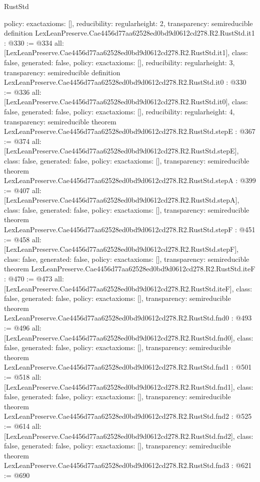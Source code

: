 \begin{lexlean}{RustStd}
\begin{coremodule}
{  policy: exact{axioms: []},
  reducibility: regular{height: 2},
  transparency: semireducible
}
definition LexLeanPreserve.Cae4456d77aa62528ed0bd9d0612cd278.R2.RustStd.it1 : @330 := @334 {
  all: [LexLeanPreserve.Cae4456d77aa62528ed0bd9d0612cd278.R2.RustStd.it1],
  class: false,
  generated: false,
  policy: exact{axioms: []},
  reducibility: regular{height: 3},
  transparency: semireducible
}
definition LexLeanPreserve.Cae4456d77aa62528ed0bd9d0612cd278.R2.RustStd.it0 : @330 := @336 {
  all: [LexLeanPreserve.Cae4456d77aa62528ed0bd9d0612cd278.R2.RustStd.it0],
  class: false,
  generated: false,
  policy: exact{axioms: []},
  reducibility: regular{height: 4},
  transparency: semireducible
}
theorem LexLeanPreserve.Cae4456d77aa62528ed0bd9d0612cd278.R2.RustStd.stepE : @367 := @374 {
  all: [LexLeanPreserve.Cae4456d77aa62528ed0bd9d0612cd278.R2.RustStd.stepE],
  class: false,
  generated: false,
  policy: exact{axioms: []},
  transparency: semireducible
}
theorem LexLeanPreserve.Cae4456d77aa62528ed0bd9d0612cd278.R2.RustStd.stepA : @399 := @407 {
  all: [LexLeanPreserve.Cae4456d77aa62528ed0bd9d0612cd278.R2.RustStd.stepA],
  class: false,
  generated: false,
  policy: exact{axioms: []},
  transparency: semireducible
}
theorem LexLeanPreserve.Cae4456d77aa62528ed0bd9d0612cd278.R2.RustStd.stepF : @451 := @458 {
  all: [LexLeanPreserve.Cae4456d77aa62528ed0bd9d0612cd278.R2.RustStd.stepF],
  class: false,
  generated: false,
  policy: exact{axioms: []},
  transparency: semireducible
}
theorem LexLeanPreserve.Cae4456d77aa62528ed0bd9d0612cd278.R2.RustStd.iteF : @470 := @473 {
  all: [LexLeanPreserve.Cae4456d77aa62528ed0bd9d0612cd278.R2.RustStd.iteF],
  class: false,
  generated: false,
  policy: exact{axioms: []},
  transparency: semireducible
}
theorem LexLeanPreserve.Cae4456d77aa62528ed0bd9d0612cd278.R2.RustStd.fnd0 : @493 := @496 {
  all: [LexLeanPreserve.Cae4456d77aa62528ed0bd9d0612cd278.R2.RustStd.fnd0],
  class: false,
  generated: false,
  policy: exact{axioms: []},
  transparency: semireducible
}
theorem LexLeanPreserve.Cae4456d77aa62528ed0bd9d0612cd278.R2.RustStd.fnd1 : @501 := @518 {
  all: [LexLeanPreserve.Cae4456d77aa62528ed0bd9d0612cd278.R2.RustStd.fnd1],
  class: false,
  generated: false,
  policy: exact{axioms: []},
  transparency: semireducible
}
theorem LexLeanPreserve.Cae4456d77aa62528ed0bd9d0612cd278.R2.RustStd.fnd2 : @525 := @614 {
  all: [LexLeanPreserve.Cae4456d77aa62528ed0bd9d0612cd278.R2.RustStd.fnd2],
  class: false,
  generated: false,
  policy: exact{axioms: []},
  transparency: semireducible
}
theorem LexLeanPreserve.Cae4456d77aa62528ed0bd9d0612cd278.R2.RustStd.fnd3 : @621 := @690 {
}
\end{coremodule}
\end{lexlean}
